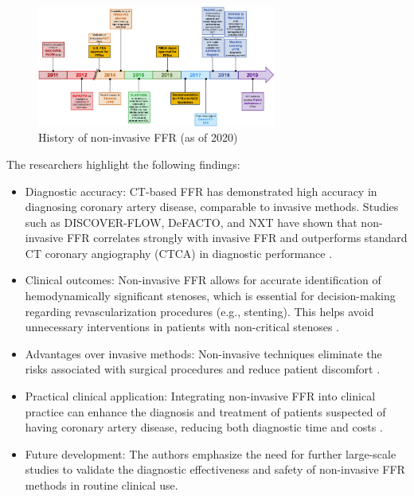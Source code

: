 \documentclass[default]{subfiles}
\begin{document}
\begin{figure}[H]
    \centering
    \includegraphics[width=0.7\textwidth]{image/pic5.png}
    \caption{History of non-invasive FFR (as of 2020) \cite{khav2020ctffr}}
\end{figure}

The researchers highlight the following findings: \newline

\begin{itemize}
\item Diagnostic accuracy: CT-based FFR has demonstrated high accuracy in diagnosing coronary artery disease,
comparable to invasive methods. Studies such as DISCOVER-FLOW, DeFACTO, and NXT have shown that non-invasive FFR
correlates strongly with invasive FFR and outperforms standard CT coronary angiography (CTCA) in diagnostic
performance \cite{debruyne_2012, bjarne_2014}.

\item Clinical outcomes: Non-invasive FFR allows for accurate identification of hemodynamically significant stenoses,
which is essential for decision-making regarding revascularization procedures (e.g., stenting). This helps avoid
unnecessary interventions in patients with non-critical stenoses \cite{morris_2013, belle_2018, chen_2019, cimen_2014}.

\item Advantages over invasive methods: Non-invasive techniques eliminate the risks associated with surgical procedures
and reduce patient discomfort \cite{mintz_2015, koo_2011}.

\item Practical clinical application: Integrating non-invasive FFR into clinical practice can enhance the diagnosis and
treatment of patients suspected of having coronary artery disease, reducing both diagnostic time and costs
\cite{asch_2015, gloekler_2014, dweck_2019}.

\item Future development: The authors emphasize the need for further large-scale studies to validate the diagnostic
effectiveness and safety of non-invasive FFR methods in routine clinical use.
\end{itemize}
\end{document}
